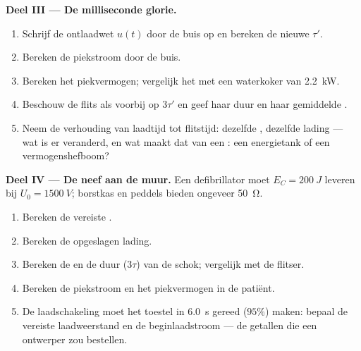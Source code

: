 \begin{problem}
\medskip
\noindent\textbf{Deel III --- De milliseconde glorie.}
\begin{enumerate}[resume]
  \item Schrijf de ontlaadwet $u(t)$ door de buis op en bereken de nieuwe
         $\tau'$.
  \item Bereken de piekstroom door de buis.
  \item Bereken het piekvermogen; vergelijk het met een waterkoker van
        \qty{2.2}{kW}.
  \item Beschouw de flits als voorbij op $3\tau'$ en geef haar duur en haar
        gemiddelde .
  \item Neem de verhouding van laadtijd tot flitstijd: dezelfde ,
        dezelfde lading --- wat is er veranderd, en wat maakt dat van een
        : een energietank of een vermogenshefboom?
\end{enumerate}

\medskip
\noindent\textbf{Deel IV --- De neef aan de muur.}
Een defibrillator moet $E_C = \qty{200}{J}$ leveren bij
$U_0 = \qty{1500}{V}$; borstkas en peddels bieden ongeveer \qty{50}{\ohm}.
\begin{enumerate}[resume]
  \item Bereken de vereiste .
  \item Bereken de opgeslagen lading.
  \item Bereken de  en de duur ($3\tau$) van de schok; vergelijk
        met de flitser.
  \item Bereken de piekstroom en het piekvermogen in de patiënt.
  \item De laadschakeling moet het toestel in \qty{6.0}{s} gereed ($95\%$)
        maken: bepaal de vereiste laadweerstand en de beginlaadstroom --- de
        getallen die een ontwerper zou bestellen.
\end{enumerate}
\end{problem}
